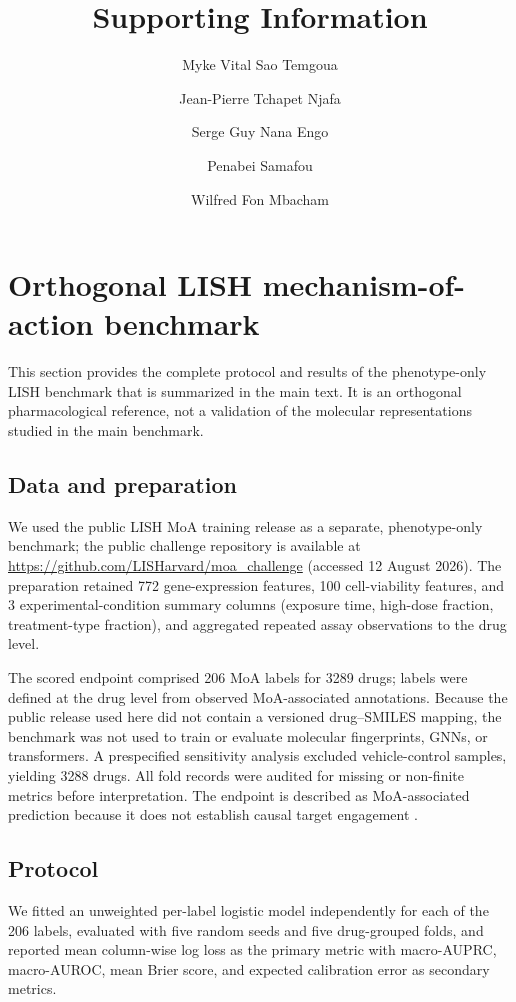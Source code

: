 \documentclass[11pt,a4paper]{article}
\title{Supporting Information}
\author{Myke Vital Sao Temgoua \and Jean-Pierre Tchapet Njafa \and Serge Guy Nana Engo \and Penabei Samafou \and Wilfred Fon Mbacham}
\date{}
\begin{document}
\maketitle

\section{Orthogonal LISH mechanism-of-action benchmark}

\label{sec:lish_si}

This section provides the complete protocol and results of the phenotype-only LISH benchmark that is summarized in the main text. It is an orthogonal pharmacological reference, not a validation of the molecular representations studied in the main benchmark.

\subsection{Data and preparation}

We used the public LISH MoA training release as a separate, phenotype-only benchmark; the public challenge repository is available at \url{https://github.com/LISHarvard/moa_challenge} (accessed 12 August 2026). The preparation retained \num{772} gene-expression features, \num{100} cell-viability features, and \num{3} experimental-condition summary columns (exposure time, high-dose fraction, treatment-type fraction), and aggregated repeated assay observations to the drug level.

The scored endpoint comprised \num{206} MoA labels for \num{3289} drugs; labels were defined at the drug level from observed MoA-associated annotations. Because the public release used here did not contain a versioned drug--SMILES mapping, the benchmark was not used to train or evaluate molecular fingerprints, GNNs, or transformers. A prespecified sensitivity analysis excluded vehicle-control samples, yielding \num{3288} drugs. All fold records were audited for missing or non-finite metrics before interpretation. The endpoint is described as MoA-associated prediction because it does not establish causal target engagement \citep{Trapotsi2022MoA}.

\subsection{Protocol}

We fitted an unweighted per-label logistic model independently for each of the \num{206} labels, evaluated with five random seeds and five drug-grouped folds, and reported mean column-wise log loss as the primary metric with macro-AUPRC, macro-AUROC, mean Brier score, and expected calibration error as secondary metrics.
\end{document}
